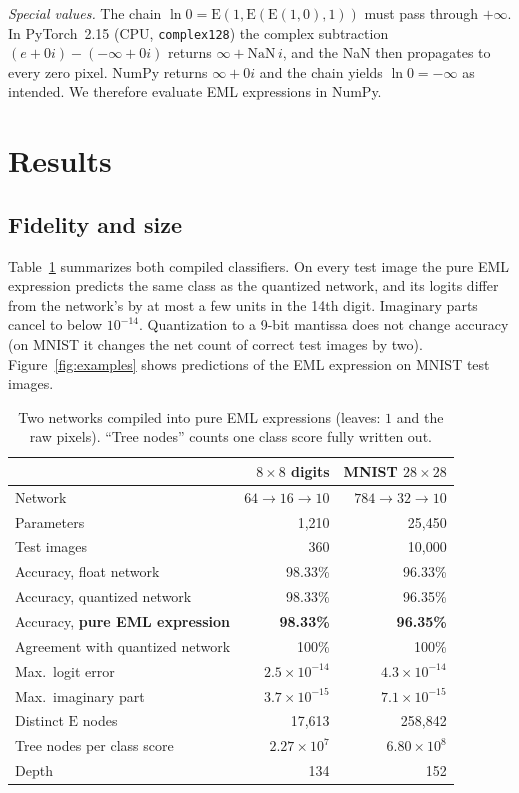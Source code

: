 \documentclass[11pt]{article}
\newcommand{\E}{\mathrm{E}}
\begin{document}
\emph{Special values.} The chain $\ln 0 = \E(1,\E(\E(1,0),1))$ must pass
through $+\infty$. In PyTorch~2.15 (CPU, \texttt{complex128}) the complex
subtraction $(e+0i)-(-\infty+0i)$ returns $\infty+\mathrm{NaN}\,i$, and the
NaN then propagates to every zero pixel. NumPy returns $\infty+0i$ and the
chain yields $\ln 0=-\infty$ as intended. We therefore evaluate EML
expressions in NumPy.

\section{Results}
\label{sec:results}

\subsection{Fidelity and size}
Table~\ref{tab:main} summarizes both compiled classifiers. On every test image
the pure EML expression predicts the same class as the quantized network,
and its logits differ from the network's by at most a few units in the
14th digit. Imaginary parts cancel to below $10^{-14}$. Quantization to a
9-bit mantissa does not change accuracy (on MNIST it changes the net
count of correct test images by two). Figure~\ref{fig:examples} shows predictions of the EML
expression on MNIST test images.

\begin{table}[htbp]
\centering
\caption{Two networks compiled into pure EML expressions (leaves: $1$ and
the raw pixels). ``Tree nodes'' counts one class score fully written out.}
\label{tab:main}
\small
\begin{tabular}{lrr}
\toprule
 & $8\times8$ digits & MNIST $28\times28$ \\
\midrule
Network & $64\!\to\!16\!\to\!10$ & $784\!\to\!32\!\to\!10$ \\
Parameters & 1{,}210 & 25{,}450 \\
Test images & 360 & 10{,}000 \\
\midrule
Accuracy, float network & 98.33\% & 96.33\% \\
Accuracy, quantized network & 98.33\% & 96.35\% \\
Accuracy, \textbf{pure EML expression} & \textbf{98.33\%} & \textbf{96.35\%} \\
Agreement with quantized network & 100\% & 100\% \\
Max.\ logit error & $2.5\times10^{-14}$ & $4.3\times10^{-14}$ \\
Max.\ imaginary part & $3.7\times10^{-15}$ & $7.1\times10^{-15}$ \\
\midrule
Distinct $\E$ nodes & 17{,}613 & 258{,}842 \\
Tree nodes per class score & $2.27\times10^{7}$ & $6.80\times10^{8}$ \\
Depth & 134 & 152 \\
\bottomrule
\end{tabular}
\end{table}
\end{document}
